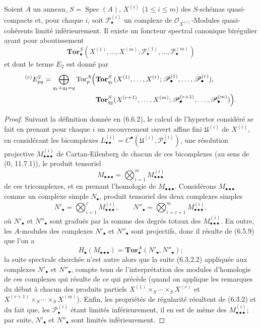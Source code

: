 \begin{corollary}[6.8.3]
Soient $A$ un anneau, $S=\operatorname{Spec}(A)$, $X^{(i)}$
($1\leq i\leq m$) des $S$-schémas quasi-compacts et, pour chaque $i$, soit
$\mathscr P_\bullet^{(i)}$ un complexe de
$\mathscr O_{X^{(i)}}$-Modules quasi-cohérents limité inférieurement. Il
existe un foncteur spectral canonique birégulier ayant pour aboutissement
\[
  \mathbf{Tor}_\bullet^S
  (X^{(1)},\ldots,X^{(m)};
   \mathscr P_\bullet^{(1)},\ldots,\mathscr P_\bullet^{(m)})
\]
et dont le terme $E_2$ est donné par
\[
\begin{split}
  {}^{(e)}E_{pq}^2
  =\bigoplus_{q_1+q_2=q}
  \operatorname{Tor}_p^A\Bigl(
  &\mathbf{Tor}_{q_1}^S
  (X^{(1)},\ldots,X^{(r)};
   \mathscr P_\bullet^{(1)},\ldots,\mathscr P_\bullet^{(r)}),\\
  &\mathbf{Tor}_{q_2}^S
  (X^{(r+1)},\ldots,X^{(m)};
   \mathscr P_\bullet^{(r+1)},\ldots,\mathscr P_\bullet^{(m)})
  \Bigr).
\end{split}
\]
\end{corollary}

\begin{proof}
Suivant la définition donnée en (6.6.2), le calcul de l'hypertor considéré se
fait en prenant pour chaque $i$ un recouvrement ouvert affine fini
$\mathfrak U^{(i)}$ de $X^{(i)}$, en considérant les bicomplexes
$L_{\bullet\bullet}^{(i)}=C^\bullet(\mathfrak U^{(i)},
\mathscr P_\bullet^{(i)})$, une résolution projective
$M_{\bullet\bullet\bullet}^{(i)}$ de Cartan-Eilenberg de chacun de ces
bicomplexes (au sens de (0, 11.7.1)), le produit tensoriel
\[
  M_{\bullet\bullet\bullet}
  =\bigotimes_{i=1}^m M_{\bullet\bullet\bullet}^{(i)}
\]
de ces tricomplexes, et en prenant l'homologie de
$M_{\bullet\bullet\bullet}$. Considérons $M_{\bullet\bullet\bullet}$ comme
un complexe simple $N_\bullet$, produit tensoriel des deux complexes simples
\[
  N'_\bullet=\bigotimes_{i=1}^r M_{\bullet\bullet\bullet}^{(i)},
  \qquad
  N''_\bullet=\bigotimes_{i=r+1}^m M_{\bullet\bullet\bullet}^{(i)},
\]
où $N'_\bullet$ et $N''_\bullet$ sont gradués par la somme des degrés totaux
des $M_{\bullet\bullet\bullet}^{(i)}$. En outre, les $A$-modules des
complexes $N'_\bullet$ et $N''_\bullet$ sont projectifs, donc il résulte de
(6.5.9) que l'on a
\[
  H_\bullet(M_{\bullet\bullet\bullet})
  =\mathbf{Tor}_\bullet^A(N'_\bullet,N''_\bullet);
\]
la suite spectrale cherchée n'est autre alors que la suite (6.3.2.2)
appliquée aux complexes $N'_\bullet$ et $N''_\bullet$, compte tenu de
l'interprétation des modules d'homologie de ces complexes qui résulte de ce
qui précède (quand on applique les remarques du début à chacun des produits
partiels
$X^{(1)}\times_S\cdots\times_S X^{(r)}$ et
$X^{(r+1)}\times_S\cdots\times_S X^{(m)}$). Enfin, les propriétés de
régularité résultent de (6.3.2) et du fait que, les
$\mathscr P_\bullet^{(i)}$ étant limités inférieurement, il en est de même
des $M_{\bullet\bullet\bullet}^{(i)}$; par suite, $N'_\bullet$ et
$N''_\bullet$ sont limités inférieurement.
\end{proof}

